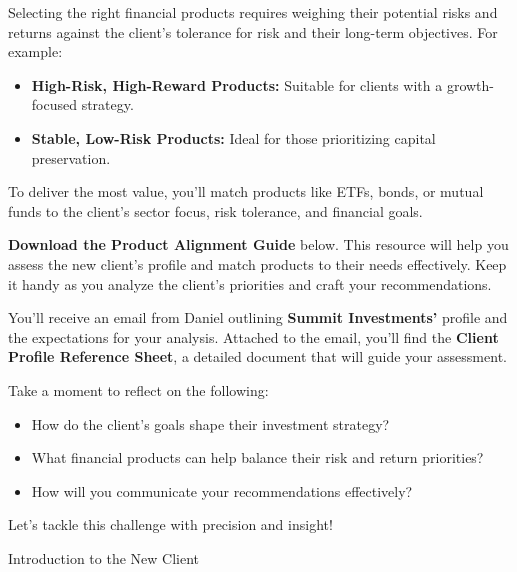 \documentclass[11pt]{article}
\begin{document}
Selecting the right financial products requires weighing their potential risks
and returns against the client's tolerance for risk and their long-term
objectives. For example:
\begin{itemize}[leftmargin=1.5em, itemsep=2pt]
  \item \textbf{High-Risk, High-Reward Products:} Suitable for clients with a
  growth-focused strategy.
  \item \textbf{Stable, Low-Risk Products:} Ideal for those prioritizing
  capital preservation.
\end{itemize}

To deliver the most value, you'll match products like ETFs, bonds, or mutual
funds to the client's sector focus, risk tolerance, and financial goals.

\textbf{Download the Product Alignment Guide} below. This resource will help
you assess the new client's profile and match products to their needs
effectively. Keep it handy as you analyze the client's priorities and craft
your recommendations.

You'll receive an email from Daniel outlining \textbf{Summit Investments'}
profile and the expectations for your analysis. Attached to the email, you'll
find the \textbf{Client Profile Reference Sheet}, a detailed document that
will guide your assessment.

Take a moment to reflect on the following:
\begin{itemize}[leftmargin=1.5em, itemsep=2pt]
  \item How do the client's goals shape their investment strategy?
  \item What financial products can help balance their risk and return
  priorities?
  \item How will you communicate your recommendations effectively?
\end{itemize}

Let's tackle this challenge with precision and insight!\par\medskip


\newpage
{\fontsize{26}{30}\selectfont Introduction to the New Client}\par\bigskip
\end{document}
